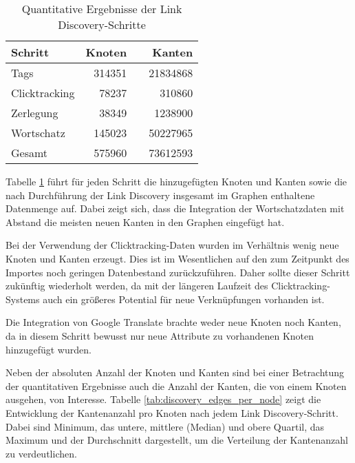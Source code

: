 \begin{table}
\centering
\begin{tabular}{lrcr}
    \toprule
    Schritt & Knoten & \phantom{abc} & Kanten \\
    \midrule
    Tags & \num{314351} && \num{21834868} \\
    Clicktracking & \num{78237} && \num{310860} \\
    Zerlegung & \num{38349} && \num{1238900} \\
    Wortschatz & \num{145023} && \num{50227965} \\
    \midrule
    Gesamt & \num{575960} && \num{73612593} \\
    \bottomrule
\end{tabular}
\caption{Quantitative Ergebnisse der Link Discovery-Schritte}
\label{tab:discovery_amounts}
\end{table}

Tabelle \ref{tab:discovery_amounts} führt für jeden Schritt die hinzugefügten Knoten und Kanten sowie die nach Durchführung der Link Discovery insgesamt im Graphen enthaltene Datenmenge auf. Dabei zeigt sich, dass die Integration der Wortschatzdaten mit Abstand die meisten neuen Kanten in den Graphen eingefügt hat. 

Bei der Verwendung der Clicktracking-Daten wurden im Verhältnis wenig neue Knoten und Kanten erzeugt. Dies ist im Wesentlichen auf den zum Zeitpunkt des Importes noch geringen Datenbestand zurückzuführen. Daher sollte dieser Schritt zukünftig wiederholt werden, da mit der längeren Laufzeit des Clicktracking-Systems auch ein größeres Potential für neue Verknüpfungen vorhanden ist.

Die Integration von Google Translate brachte weder neue Knoten noch Kanten, da in diesem Schritt bewusst nur neue Attribute zu vorhandenen Knoten hinzugefügt wurden.

Neben der absoluten Anzahl der Knoten und Kanten sind bei einer Betrachtung der quantitativen Ergebnisse auch die Anzahl der Kanten, die von einem Knoten ausgehen, von Interesse. Tabelle \ref{tab:discovery_edges_per_node} zeigt die Entwicklung der Kantenanzahl pro Knoten nach jedem Link Discovery-Schritt. Dabei sind Minimum, das untere, mittlere (Median) und obere Quartil, das Maximum und der Durchschnitt dargestellt, um die Verteilung der Kantenanzahl zu verdeutlichen.

